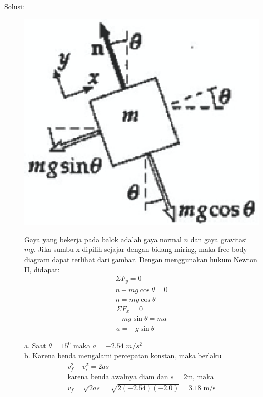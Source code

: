 \begin{description}
    \item[Solusi:]
        \mbox{}
\begin{center}
\includegraphics [scale=0.5]{./latex/eps/1_5_8_image_2.eps}
\end{center}
Gaya yang bekerja pada balok adalah gaya normal $n$ dan gaya gravitasi $mg$. Jika sumbu-x dipilih sejajar dengan bidang miring, maka free-body diagram dapat terlihat dari gambar. Dengan menggunakan hukum Newton II, didapat:
\begin{eqnarray*}
\Sigma F_{y}=0 \\
n-mg\cos\theta=0 \\
n=mg \cos\theta
\end{eqnarray*}
\begin{eqnarray*}
\Sigma F_{x}=0 \\
-mg\sin\theta=ma \\
a=-g \sin\theta
\end{eqnarray*}

a. Saat $\theta=15^{0}$ maka $a=-2.54$ $m/s^{2}$ \\
b. Karena benda mengalami percepatan konstan, maka berlaku
\begin{eqnarray*}
v_{f}^{2}-v_{i}^{2}=2as \\ 
\mbox{karena benda awalnya diam dan $s=2$m, maka} \\
v_{f}=\sqrt{2as}=\sqrt{2(-2.54)(-2.0)}= 3.18 \textrm{ m/s}
\end{eqnarray*} 
\end{description}
